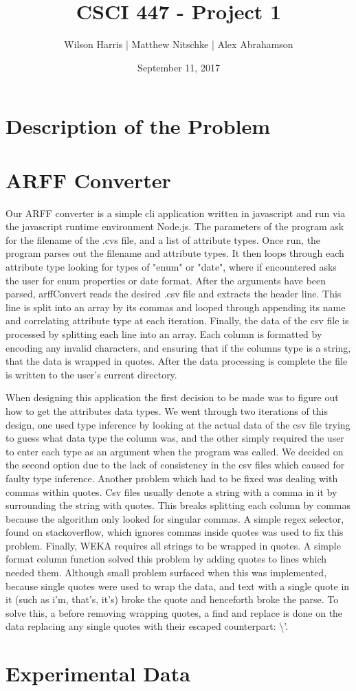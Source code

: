 \documentclass[11pt]{article} %
\title{\textbf{CSCI 447 - Project 1}}
\author{Wilson Harris | Matthew Nitschke | Alex Abrahamson }
\date{September 11, 2017}
\begin{document}
\maketitle

\section{Description of the Problem}

\section{ARFF Converter}

Our ARFF converter is a simple cli application written in javascript and run via the javascript runtime environment Node.js. The parameters of the program ask for the filename of the .cvs file, and a list of attribute types. Once run, the program parses out the filename and attribute types. It then loops through each attribute type looking for types of "enum" or "date", where if encountered asks the user for enum properties or date format. After the arguments have been parsed, arffConvert reads the desired .csv file and extracts the header line. This line is split into an array by its commas and looped through appending its name and correlating attribute type at each iteration. Finally, the data of the csv file is processed by splitting each line into an array. Each column is formatted by encoding any invalid characters, and ensuring that if the columns type is a string, that the data is wrapped in quotes. After the data processing is complete the file is written to the user's current directory.

When designing this application the first decision to be made was to figure out how to get the attributes data types. We went through two iterations of this design, one used type inference by looking at the actual data of the csv file trying to guess what data type the column was, and the other simply required the user to enter each type as an argument when the program was called. We decided on the second option due to the lack of consistency in the csv files which caused for faulty type inference. Another problem which had to be fixed was dealing with commas within quotes. Csv files usually denote a string with a comma in it by surrounding the string with quotes. This breaks splitting each column by commas because the algorithm only looked for singular commas. A simple regex selector, found on stackoverflow, which ignores commas inside quotes was used to fix this problem. Finally, WEKA requires all strings to be wrapped in quotes. A simple format column function solved this problem by adding quotes to lines which needed them. Although small problem surfaced when this was implemented, because single quotes were used to wrap the data, and text with a single quote in it (such as i'm, that's, it's) broke the quote and henceforth broke the parse. To solve this, a before removing wrapping quotes, a find and replace is done on the data replacing any single quotes with their escaped counterpart: \textbackslash'.



\section{Experimental Data}
\end{document}
